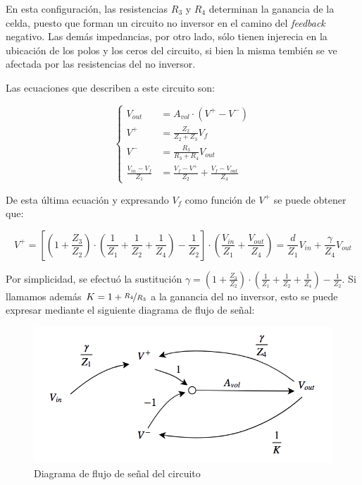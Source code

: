 \documentclass[../../tc_tp5_main.tex]{subfiles}
\begin{document}
En esta configuraci\'on, las resistencias $R_3$ y $R_4$ determinan la ganancia de la celda, puesto que forman un circuito no inversor en el camino del \textit{feedback} negativo. Las dem\'as impedancias, por otro lado, s\'olo tienen injerecia en la ubicaci\'on de los polos y los ceros del circuito, si bien la misma tembi\'en se ve afectada por las resistencias del no inversor.\par

Las ecuaciones que describen a este circuito son: 

\begin{equation}
	\left\{
 	\begin{aligned}
 		V_{out} &= A_{vol} \cdot (V^+ - V^-) \\
 		V^+ &= \frac{Z_2}{Z_2+Z_3} V_f  \\
		V^- &= \frac{R_3}{R_3+R_4} V_{out} \\
		\frac{V_{in} - V_f}{Z_1} &= \frac{V_f - V^+}{Z_2} +\frac{V_f - V_{out}}{Z_4} 
	\end{aligned}
	\right.
 \end{equation}
 
De esta \'ultima ecuaci\'on y expresando $V_f$ como funci\'on de $V^+$ se puede obtener que:

\begin{equation}
	V^+ = \left[ \left(1 + \frac{Z_3}{Z_2}\right) \cdot \left( \frac{1}{Z_1} + \frac{1}{Z_2} + \frac{1}{Z_4}\right) - \frac{1}{Z_2}\right] \cdot
			\left( \frac{V_{in}}{Z_1} + \frac{V_{out}}{Z_4}\right) = \frac{d}{Z_1} V_{in} + \frac{\gamma}{Z_4} V_{out}
\end{equation}

Por simplicidad, se efectu\'o la sustituci\'on $\gamma = \left(1 + \frac{Z_3}{Z_2}\right) \cdot \left( \frac{1}{Z_1} + \frac{1}{Z_2} + \frac{1}{Z_4}\right) - \frac{1}{Z_2}$.
Si llamamos adem\'as $K = 1 + \nicefrac{R_4}{R_3}$ a la ganancia del no inversor, esto se puede expresar mediante el siguiente diagrama de flujo de se\~nal: \par

\begin{figure}[H]
	\centering
	\includegraphics[scale=0.5]{imagenes/tc_tp1_ej1_df_1.png}
	
	\caption{Diagrama de flujo de se\~nal del circuito}
\end{figure}
\end{document}
